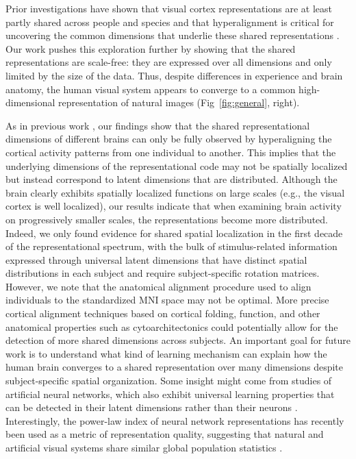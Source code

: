 \documentclass[10pt]{article}
\begin{document}
Prior investigations have shown that visual cortex representations are at least partly shared across people and species \autocite{Haxby2011,Kriegeskorte2008} and that hyperalignment is critical for uncovering the common dimensions that underlie these shared representations \autocite{Haxby2011,Haxby2020}. Our work pushes this exploration further by showing that the shared representations are scale-free: they are expressed over all dimensions and only limited by the size of the data. Thus, despite differences in experience and brain anatomy, the human visual system appears to converge to a common high-dimensional representation of natural images (Fig~\ref{fig:general}, right).

As in previous work \autocite{Haxby2011}, our findings show that the shared representational dimensions of different brains can only be fully observed by hyperaligning the cortical activity patterns from one individual to another. This implies that the underlying dimensions of the representational code may not be spatially localized but instead correspond to latent dimensions that are distributed. Although the brain clearly exhibits spatially localized functions on large scales (e.g., the visual cortex is well localized), our results indicate that when examining brain activity on progressively smaller scales, the representations become more distributed. Indeed, we only found evidence for shared spatial localization in the first decade of the representational spectrum, with the bulk of stimulus-related information expressed through universal latent dimensions that have distinct spatial distributions in each subject and require subject-specific rotation matrices. However, we note that the anatomical alignment procedure used to align individuals to the standardized MNI space may not be optimal. More precise cortical alignment techniques based on cortical folding, function, and other anatomical properties such as cytoarchitectonics could potentially allow for the detection of more shared dimensions across subjects. An important goal for future work is to understand what kind of learning mechanism can explain how the human brain converges to a shared representation over many dimensions despite subject-specific spatial organization. Some insight might come from studies of artificial neural networks, which also exhibit universal learning properties that can be detected in their latent dimensions rather than their neurons \autocites[e.g.][]{Guth2024,Chen2024}. Interestingly, the power-law index of neural network representations has recently been used as a metric of representation quality, suggesting that natural and artificial visual systems share similar global population statistics \autocite{Agrawal2022}.
\end{document}
